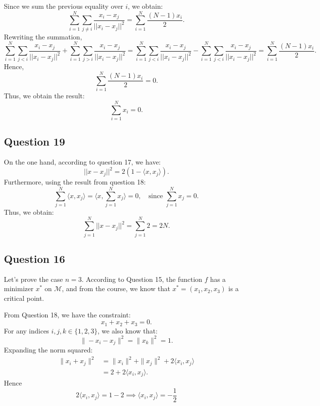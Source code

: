 \documentclass{article}
\begin{document}
Since we sum the previous equality over \( i \), we obtain:
\[
\sum_{i=1}^{N}  \sum_{j \neq i} \frac{x_i - x_j}{||x_i - x_j||^2} = \sum_{i=1}^{N}\frac{(N-1) x_i}{2}.
\]
Rewriting the summation,
\[
\sum_{i =1}^{N} \sum_{j<i} \frac{x_i - x_j}{||x_i - x_j||^2} + \sum_{i=1}^{N} \sum_{j>i} \frac{x_i - x_j}{||x_i - x_j||^2} =\sum_{i =1}^{N} \sum_{j<i} \frac{x_i - x_j}{||x_i - x_j||^2} - \sum_{i =1}^{N} \sum_{j<i} \frac{x_i - x_j}{||x_i - x_j||^2} = \sum_{i=1}^{N}\frac{(N-1) x_i}{2}.
\]
Hence,
\[
\sum_{i=1}^{N}\frac{(N-1) x_i}{2} = 0.
\]
Thus, we obtain the result:
\[
\sum_{i=1}^{N} x_i = 0.
\]




\subsection*{Question 19}

On the one hand, according to question 17, we have:
\[
||x - x_j||^2 = 2 (1 - \langle x, x_j \rangle).
\]
Furthermore, using the result from question 18:
\[
\sum_{j=1}^{N} \langle x, x_j \rangle = \langle x, \sum_{j=1}^{N} x_j \rangle = 0, \quad \text{since } \sum_{j=1}^{N} x_j = 0.
\]
Thus, we obtain:
\[
\sum_{j=1}^{N} ||x - x_j||^2 = \sum_{j=1}^{N} 2 = 2N.
\]


\subsection*{Question 16}
Let's prove the case $n=3$. According to Question 15, the function $f$ has a minimizer $x^*$ on $\mathcal{M}$, and from the course, we know that $x^* = (x_1, x_2, x_3)$ is a critical point. 

From Question 18, we have the constraint:
\begin{equation}
    x_1 + x_2 + x_3 = 0.
\end{equation}
For any indices $i, j, k \in \{1,2,3\}$, we also know that:
\begin{equation}
    \| -x_i - x_j \|^2 = \| x_k \|^2 = 1.
\end{equation}
Expanding the norm squared:
\begin{align*}
    \| x_i + x_j \|^2 &= \| x_i \|^2 + \| x_j \|^2 + 2 \langle x_i, x_j \rangle \\
    &= 2 + 2 \langle x_i, x_j \rangle.
\end{align*}
Hence
\begin{equation}
    2\langle x_i, x_j \rangle = 1-2 \implies \langle x_i, x_j \rangle=-\frac{1}{2}
\end{equation}
\end{document}
